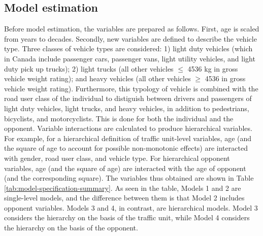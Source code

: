 \documentclass[]{elsarticle} %
\begin{document}
\hypertarget{model-estimation}{%
\subsection{Model estimation}\label{model-estimation}}

Before model estimation, the variables are prepared as follows. First,
age is scaled from years to decades. Secondly, new variables are defined
to describe the vehicle type. Three classes of vehicle types are
considered: 1) light duty vehicles (which in Canada include passenger
cars, passenger vans, light utility vehicles, and light duty pick up
trucks); 2) light trucks (all other vehicles \(\le\) 4536 kg in gross
vehicle weight rating); and heavy vehicles (all other vehicles \(\ge\)
4536 in gross vehicle weight rating). Furthermore, this typology of
vehicle is combined with the road user class of the individual to
distiguish between drivers and passengers of light duty vehicles, light
trucks, and heavy vehicles, in addition to pedestrians, bicyclists, and
motorcyclists. This is done for both the individual and the opponent.
Variable interactions are calculated to produce hierarchical variables.
For example, for a hierarchical definition of traffic unit-level
variables, age (and the square of age to account for possible
non-monotonic effects) are interacted with gender, road user class, and
vehicle type. For hierarchical opponent variables, age (and the square
of age) are interacted with the age of opponent (and the corresponding
square). The variables thus obtained are shown in Table
\ref{tab:model-specification-summary}. As seen in the table, Models 1
and 2 are single-level models, and the difference between them is that
Model 2 includes opponent variables. Models 3 and 4, in contrast, are
hierarchical models. Model 3 considers the hierarchy on the basis of the
traffic unit, while Model 4 considers the hierarchy on the basis of the
opponent.
\end{document}
